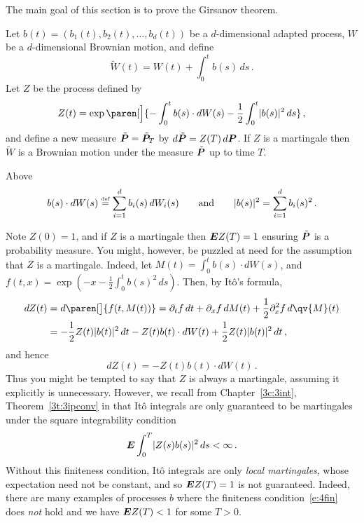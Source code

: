 The main goal of this section is to prove the Girsanov theorem.
\begin{theorem}\label{t:4girsanov}
  Let $b(t) = (b_1(t), b_2(t), \dots, b_d(t))$ be a $d$-dimensional adapted process, $W$ be a $d$-dimensional Brownian motion, and define
  \begin{equation*}
    \tilde W(t) = W(t) + \int_0^t b(s) \, ds\,.
  \end{equation*}
  Let $Z$ be the process defined by
  \begin{equation*}
    Z(t) = \exp\paren[\Big]{ -\int_0^t b(s) \cdot dW(s) - \frac{1}{2}\int_0^t \abs{b(s)}^2 \, ds}\,,
  \end{equation*}
  and define a new measure $\tilde\P = \tilde\P_T$ by $d\tilde\P = Z(T) \, d\P$.
  If $Z$ is a martingale then $\tilde W$ is a Brownian motion under the measure $\tilde \P$ up to time $T$.
\end{theorem}
\begin{remark}
  Above
  \begin{equation*}
    b(s) \cdot dW(s) \defeq \sum_{i=1}^{d} b_i(s) \, dW_i(s)
    \qquad\text{and}\qquad
    \abs{b(s)}^2 = \sum_{i=1}^{d} b_i(s)^2\,.
  \end{equation*}
\end{remark}
\begin{remark}
  Note $Z(0) = 1$, and if $Z$ is a martingale then $\E Z(T) = 1$ ensuring $\tilde\P$ is a probability measure.
  You might, however, be puzzled at need for the assumption that $Z$ is a martingale.
  Indeed, let $M(t) = \int_0^t b(s) \cdot dW(s)$, and $f(t, x) = \exp(-x - \frac{1}{2} \int_0^t b(s)^2 \, ds )$.
  Then, by It\^o's formula,
  \begin{align*}
    dZ(t)
      &= d\paren[\big]{ f(t, M(t)) }
      = \partial_t f \, dt + \partial_x f \, dM(t)  + \frac{1}{2} \partial_x^2 f \, d\qv{M}(t)
    \\
      &= -\frac{1}{2} Z(t) \abs{b(t)}^2 \, dt
	-Z(t) b(t) \cdot dW(t) 
	+ \frac{1}{2} Z(t) \abs{b(t)}^2 \, dt\,,
  \end{align*}
  and hence
  \begin{equation}\label{e:4dz}
      dZ(t) = -Z(t) b(t) \cdot dW(t)\,.
  \end{equation}
  Thus you might be tempted to say that $Z$ is always a martingale, assuming it explicitly is unnecessary.
  However, we recall from Chapter~\ref{3c:3int}, Theorem~\ref{3t:3ipconv} in that It\^o integrals are only guaranteed to be martingales under the square integrability condition
  \begin{equation}\label{e:4fin}
    \E \int_0^T \abs{Z(s) b(s)}^2 \, ds < \infty\,.
  \end{equation}
  Without this finiteness condition, It\^o integrals are only \emph{local martingales}, whose expectation need not be constant, and so $\E Z(T) = 1$ is not guaranteed.
  Indeed, there are many examples of processes $b$ where the finiteness condition~\eqref{e:4fin} does \emph{not} hold and we have $\E Z(T) < 1$ for some $T > 0$.
\end{remark}

